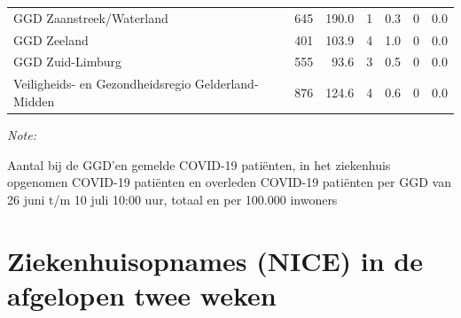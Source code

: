 \documentclass[
  english,
  man,floatsintext]{apa6}
\begin{document}
\begin{table}
\begin{threeparttable}
\begin{tabular}{lrrrrrr}
GGD Zaanstreek/Waterland & 645 & 190.0 & 1 & 0.3 & 0 & 0.0\\
GGD Zeeland & 401 & 103.9 & 4 & 1.0 & 0 & 0.0\\
GGD Zuid-Limburg & 555 & 93.6 & 3 & 0.5 & 0 & 0.0\\
Veiligheids- en Gezondheidsregio Gelderland-Midden & 876 & 124.6 & 4 & 0.6 & 0 & 0.0\\
\bottomrule
\end{tabular}
\begin{tablenotes}
\item \textit{Note: } 
\item Aantal bij de GGD’en gemelde COVID-19 patiënten, in het ziekenhuis opgenomen COVID-19 patiënten en overleden COVID-19 patiënten per GGD van 26 juni t/m 10 juli 10:00 uur, totaal en per 100.000 inwoners
\end{tablenotes}
\end{threeparttable}
\endgroup{}
\end{table}

\newpage

\hypertarget{ziekenhuisopnames-nice-in-de-afgelopen-twee-weken}{%
\section{Ziekenhuisopnames (NICE) in de afgelopen twee weken}\label{ziekenhuisopnames-nice-in-de-afgelopen-twee-weken}}
\end{document}
